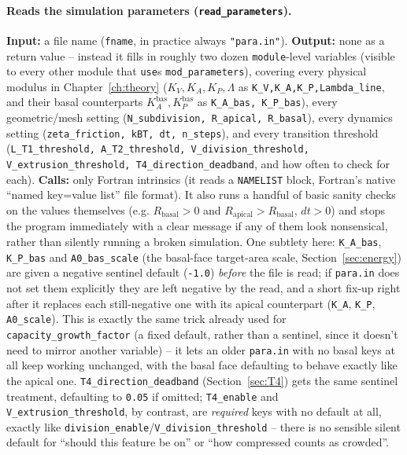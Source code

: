 \documentclass[11pt,a4paper]{report}
\begin{document}
\paragraph{Reads the simulation parameters (\texttt{read\_parameters}).}
\textbf{Input:} a file name (\texttt{fname}, in practice always
\texttt{"para.in"}). \textbf{Output:} none as a return value -- instead
it fills in roughly two dozen \texttt{module}-level variables (visible
to every other module that \texttt{use}s \texttt{mod\_parameters}),
covering every physical modulus in Chapter~\ref{ch:theory}
($K_V,K_A,K_P,\Lambda$ as \texttt{K\_V,K\_A,K\_P,Lambda\_line}, and
their basal counterparts $K_A^{\mathrm{bas}}, K_P^{\mathrm{bas}}$ as
\texttt{K\_A\_bas, K\_P\_bas}), every geometric/mesh setting
(\texttt{N\_subdivision, R\_apical, R\_basal}), every dynamics setting
(\texttt{zeta\_friction, kBT, dt, n\_steps}), and every transition
threshold (\texttt{L\_T1\_threshold, A\_T2\_threshold,
V\_division\_threshold, V\_extrusion\_threshold,
T4\_direction\_deadband}, and how often to check for each).
\textbf{Calls:} only Fortran intrinsics (it reads a \texttt{NAMELIST}
block, Fortran's native ``named key=value list'' file format). It also
runs a handful of basic sanity checks on the values themselves (e.g.
$R_{\mathrm{basal}}>0$ and $R_{\mathrm{apical}}>R_{\mathrm{basal}}$,
$dt>0$) and stops the program immediately with a clear message if any
of them look nonsensical, rather than silently running a broken
simulation. One subtlety here: \texttt{K\_A\_bas}, \texttt{K\_P\_bas}
and \texttt{A0\_bas\_scale} (the basal-face target-area scale,
Section~\ref{sec:energy}) are given a negative sentinel default
(\texttt{-1.0}) \emph{before} the file is read; if \texttt{para.in}
does not set them explicitly they are left negative by the read, and a
short fix-up right after it replaces each still-negative one with its
apical counterpart (\texttt{K\_A}, \texttt{K\_P}, \texttt{A0\_scale}).
This is exactly the same trick already used for
\texttt{capacity\_growth\_factor} (a fixed default, rather than a
sentinel, since it doesn't need to mirror another variable) -- it lets
an older \texttt{para.in} with no basal keys at all keep working
unchanged, with the basal face defaulting to behave exactly like the
apical one. \texttt{T4\_direction\_deadband} (Section~\ref{sec:T4})
gets the same sentinel treatment, defaulting to \texttt{0.05} if
omitted; \texttt{T4\_enable} and \texttt{V\_extrusion\_threshold}, by
contrast, are \emph{required} keys with no default at all, exactly like
\texttt{division\_enable}/\texttt{V\_division\_threshold} -- there is
no sensible silent default for ``should this feature be on'' or ``how
compressed counts as crowded''.
\end{document}
